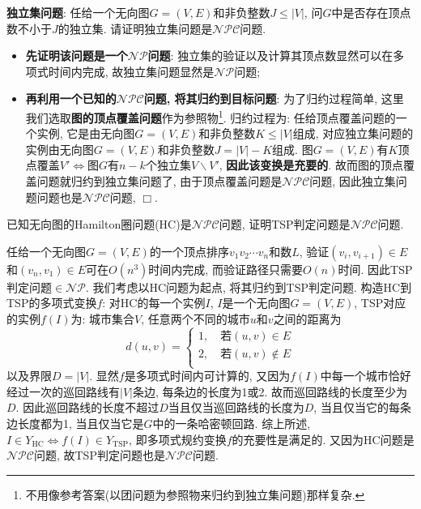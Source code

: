 \documentclass{article}
\begin{document}
\begin{homeworkProblem}
	\textbf{独立集问题}: 任给一个无向图$G=(V,E)$和非负整数$J\leq |V|$, 问$G$中是否存在顶点数不小于$J$的独立集. 请证明独立集问题是$\mathcal{NPC}$问题.

	\solution 
	\begin{itemize}
		\item \textbf{先证明该问题是一个$\mathcal{NP}$问题}: 独立集的验证以及计算其顶点数显然可以在多项式时间内完成, 故独立集问题显然是$\mathcal{NP}$问题;
		\item \textbf{再利用一个已知的$\mathcal{NPC}$问题, 将其归约到目标问题}: 为了归约过程简单, 这里我们选取\textbf{图的顶点覆盖问题}作为参照物\footnote{不用像参考答案(以团问题为参照物来归约到独立集问题)那样复杂.}. 归约过程为: 任给顶点覆盖问题的一个实例, 它是由无向图$G=(V,E)$和非负整数$K\leq |V|$组成, 对应独立集问题的实例由无向图$G=(V,E)$和非负整数$J=|V|-K$组成. 图$G=(V,E)$有$K$顶点覆盖$V'\Leftrightarrow $图$G$有$n-k$个独立集$V\backslash V'$, \textbf{因此该变换是充要的}. 故而图的顶点覆盖问题就归约到独立集问题了, 由于顶点覆盖问题是$\mathcal{NPC}$问题, 因此独立集问题问题也是$\mathcal{NPC}$问题, $\Box$.
	\end{itemize}
\end{homeworkProblem}


\begin{homeworkProblem}
	已知无向图的Hamilton圈问题(HC)是$\mathcal{NPC}$问题, 证明TSP判定问题是$\mathcal{NPC}$问题.

	\solution 任给一个无向图$G=(V,E)$的一个顶点排序$v_1v_2\cdots v_n$和数$L$, 验证$(v_i,v_{i+1})\in E$和$(v_n,v_1)\in E$可在$O(n^3)$时间内完成, 而验证路径只需要$O(n)$时间. 因此TSP判定问题$\in \mathcal{NP}$. 我们考虑以HC问题为起点, 将其归约到TSP判定问题. 构造HC到TSP的多项式变换$f$: 对HC的每一个实例$I$, $I$是一个无向图$G=(V,E)$, TSP对应的实例$f(I)$为: 城市集合$V$, 任意两个不同的城市$u$和$v$之间的距离为
	$$
	d\left( u,v \right) =\left\{ \begin{array}{c}
		1,\quad \text{若}\left( u,v \right) \in E\\
		2,\quad \text{若}\left( u,v \right) \notin E\\
	\end{array} \right.
	$$
	以及界限$D=|V|$. 显然$f$是多项式时间内可计算的, 又因为$f(I)$中每一个城市恰好经过一次的巡回路线有$|V|$条边, 每条边的长度为1或2. 故而巡回路线的长度至少为$D$. 因此巡回路线的长度不超过$D$当且仅当巡回路线的长度为$D$, 当且仅当它的每条边长度都为1, 当且仅当它是$G$中的一条哈密顿回路. 综上所述, $I\in Y_{\text{HC}}\Leftrightarrow f(I)\in Y_{\text{TSP}}$, 即多项式规约变换$f$的充要性是满足的. 又因为HC问题是$\mathcal{NPC}$问题, 故TSP判定问题也是$\mathcal{NPC}$问题.
\end{homeworkProblem}
\end{document}
